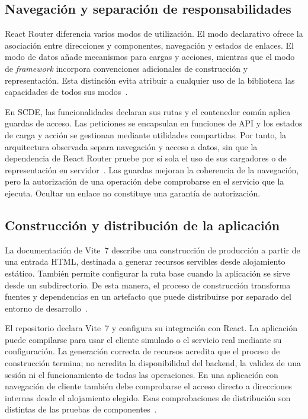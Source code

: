\subsection{Navegación y separación de responsabilidades}

React Router diferencia varios modos de utilización. El modo declarativo ofrece
la asociación entre direcciones y componentes, navegación y estados de enlaces.
El modo de datos añade mecanismos para cargas y acciones, mientras que el modo
de \textit{framework} incorpora convenciones adicionales de construcción y
representación. Esta distinción evita atribuir a cualquier uso de la biblioteca
las capacidades de todos sus modos~\cite{codex_router_modes}.

En SCDE, las funcionalidades declaran sus rutas y el contenedor común aplica
guardas de acceso. Las peticiones se encapsulan en funciones de API y los estados
de carga y acción se gestionan mediante utilidades compartidas. Por tanto, la
arquitectura observada separa navegación y acceso a datos, sin que la dependencia
de React Router pruebe por sí sola el uso de sus cargadores o de representación
en servidor~\cite{codex_scde_frontend_architecture}.
Las guardas mejoran la coherencia de la navegación, pero la autorización de una
operación debe comprobarse en el servicio que la ejecuta. Ocultar un enlace no
constituye una garantía de autorización.

\subsection{Construcción y distribución de la aplicación}

La documentación de Vite~7 describe una construcción de producción a partir de
una entrada HTML, destinada a generar recursos servibles desde alojamiento
estático. También permite configurar la ruta base cuando la aplicación se sirve
desde un subdirectorio. De esta manera, el proceso de construcción transforma
fuentes y dependencias en un artefacto que puede distribuirse por separado del
entorno de desarrollo~\cite{codex_vite7_build}.

El repositorio declara Vite~7 y configura su integración con React. La aplicación
puede compilarse para usar el cliente simulado o el servicio real mediante su
configuración. La generación correcta de recursos acredita que el proceso de
construcción termina; no acredita la disponibilidad del backend, la validez de una
sesión ni el funcionamiento de todas las operaciones. En una aplicación con
navegación de cliente también debe comprobarse el acceso directo a direcciones
internas desde el alojamiento elegido. Esas comprobaciones de distribución son
distintas de las pruebas de componentes~\cite{codex_scde_frontend_architecture}.

